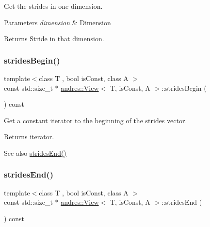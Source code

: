 Get the strides in one dimension.


\begin{DoxyParams}{Parameters}
{\em dimension} & Dimension \\
\hline
\end{DoxyParams}
\begin{DoxyReturn}{Returns}
Stride in that dimension. 
\end{DoxyReturn}
\mbox{\label{classandres_1_1View_aae2009aeccd7029a7c31767764d09677}} 
\subsubsection{\texorpdfstring{strides\+Begin()}{stridesBegin()}}
{\footnotesize\ttfamily template$<$class T , bool is\+Const, class A $>$ \\
const std\+::size\+\_\+t $\ast$ \hyperlink{classandres_1_1View}{andres\+::\+View}$<$ T, is\+Const, A $>$\+::strides\+Begin (\begin{DoxyParamCaption}{ }\end{DoxyParamCaption}) const\hspace{0.3cm}{\ttfamily [inline]}}

Get a constant iterator to the beginning of the strides vector.

\begin{DoxyReturn}{Returns}
iterator. 
\end{DoxyReturn}
\begin{DoxySeeAlso}{See also}
\hyperlink{classandres_1_1View_ab193e982560b93da97e8755de0980525}{strides\+End()} 
\end{DoxySeeAlso}
\mbox{\label{classandres_1_1View_ab193e982560b93da97e8755de0980525}} 
\subsubsection{\texorpdfstring{strides\+End()}{stridesEnd()}}
{\footnotesize\ttfamily template$<$class T , bool is\+Const, class A $>$ \\
const std\+::size\+\_\+t $\ast$ \hyperlink{classandres_1_1View}{andres\+::\+View}$<$ T, is\+Const, A $>$\+::strides\+End (\begin{DoxyParamCaption}{ }\end{DoxyParamCaption}) const\hspace{0.3cm}{\ttfamily [inline]}}

